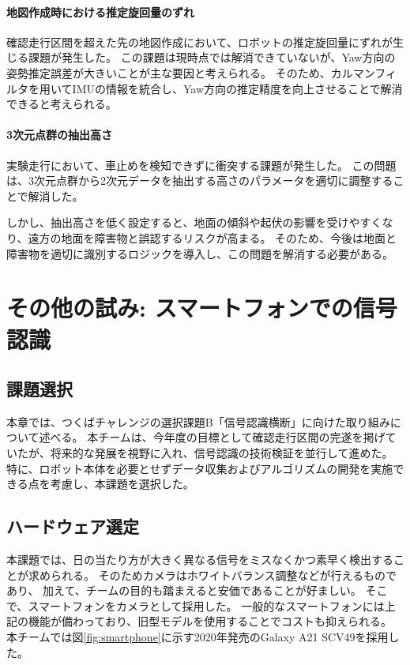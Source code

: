 \documentclass[twocolumn,9pt]{jsproceedings}
\begin{document}
\paragraph{地図作成時における推定旋回量のずれ}
確認走行区間を超えた先の地図作成において、ロボットの推定旋回量にずれが生じる課題が発生した。
この課題は現時点では解消できていないが、Yaw方向の姿勢推定誤差が大きいことが主な要因と考えられる。
そのため、カルマンフィルタを用いてIMUの情報を統合し、Yaw方向の推定精度を向上させることで解消できると考えられる。

\paragraph{3次元点群の抽出高さ}
実験走行において、車止めを検知できずに衝突する課題が発生した。
この問題は、3次元点群から2次元データを抽出する高さのパラメータを適切に調整することで解消した。

しかし、抽出高さを低く設定すると、地面の傾斜や起伏の影響を受けやすくなり、遠方の地面を障害物と誤認するリスクが高まる。
そのため、今後は地面と障害物を適切に識別するロジックを導入し、この問題を解消する必要がある。

\section{その他の試み: スマートフォンでの信号認識}

\subsection{課題選択}
本章では、つくばチャレンジの選択課題B「信号認識横断」に向けた取り組みについて述べる。
本チームは、今年度の目標として確認走行区間の完遂を掲げていたが、将来的な発展を視野に入れ、信号認識の技術検証を並行して進めた。
特に、ロボット本体を必要とせずデータ収集およびアルゴリズムの開発を実施できる点を考慮し、本課題を選択した。

\subsection{ハードウェア選定}
本課題では、日の当たり方が大きく異なる信号をミスなくかつ素早く検出することが求められる。
そのためカメラはホワイトバランス調整などが行えるものであり、
加えて、チームの目的も踏まえると安価であることが好ましい。
そこで、スマートフォンをカメラとして採用した。
一般的なスマートフォンには上記の機能が備わっており、旧型モデルを使用することでコストも抑えられる。
本チームでは図\ref{fig:smartphone}に示す2020年発売のGalaxy A21 SCV49を採用した。
\end{document}
